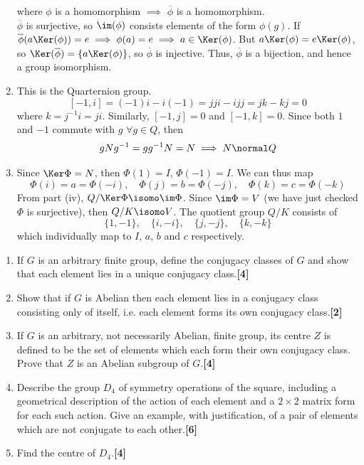 \documentclass[a4paper]{article}
\begin{document}
\begin{ans}
\begin{enumerate}[label=(\roman*)]
where $\phi$ is a homomorphism $\implies$ $\overline{\phi}$ is a homomorphism.\\[5pt]
$\overline{\phi}$ is surjective, so $\im(\phi)$ consists elements of the form $\phi(g)$. If $\overline{\phi}(a\Ker(\phi))=e\implies\phi(a)=e\implies a\in\Ker(\phi)$. But $a\Ker(\phi)=e\Ker(\phi)$, so $\Ker(\overline{\phi})=\{a\Ker(\phi)\}$, so $\overline{\phi}$ is injective. Thus, $\overline{\phi}$ is a bijection, and hence a group isomorphism.
\item This is the Quarternion group.
$$[-1,i]=(-1)i-i(-1)=jji-ijj=jk-kj=0$$
where $k=j^{-1}i=ji$. Similarly, $[-1,j]=0$ and $[-1,k]=0$. Since both $1$ and $-1$ commute with $g$ $\forall g\in Q$, then
$$gNg^{-1}=gg^{-1}N=N\implies N\normal Q$$
\item Since $\Ker\Phi=N$, then $\Phi(1)=I$, $\Phi(-1)=I$. We can thus map
$$\Phi(i)=a=\Phi(-i),\quad \Phi(j)=b=\Phi(-j),\quad\Phi(k)=c=\Phi(-k)$$
From part (iv), $Q/\Ker\Phi\isomo\im\Phi$. Since $\im\Phi=V$ (we have just checked $\Phi$ is surjective), then $Q/K\isomo V$. The quotient group $Q/K$ consists of 
$$\{1,-1\},\quad\{i,-i\},\quad\{j,-j\},\quad\{k,-k\}$$
which individually map to $I$, $a$, $b$ and $c$ respectively.
\end{enumerate}
\end{ans}
\begin{qns}\leavevmode
\begin{enumerate}[label=(\roman*)]
    \item If $G$ is an arbitrary finite group, define the conjugacy classes of $G$ and show that each element lies in a unique conjugacy class.\hfill\textbf{[4]}
    \item Show that if $G$ is Abelian then each element lies in a conjugacy class consisting only of itself, i.e. each element forms its own conjugacy class.\hfill\textbf{[2]}
    \item If $G$ is an arbitrary, not necessarily Abelian, finite group, its centre $Z$ is defined to be the set of elements which each form their own conjugacy class. Prove that $Z$ is an Abelian subgroup of $G$.\hfill\textbf{[4]}
    \item Describe the group $D_4$ of symmetry operations of the square, including a geometrical description of the action of each element and a $2\times 2$ matrix form for each such action. Give an example, with justification, of a pair of elements which are not conjugate to each other.\hfill\textbf{[6]}
    \item Find the centre of $D_4$.\hfill\textbf{[4]}
\end{enumerate}
\end{qns}
\end{document}
